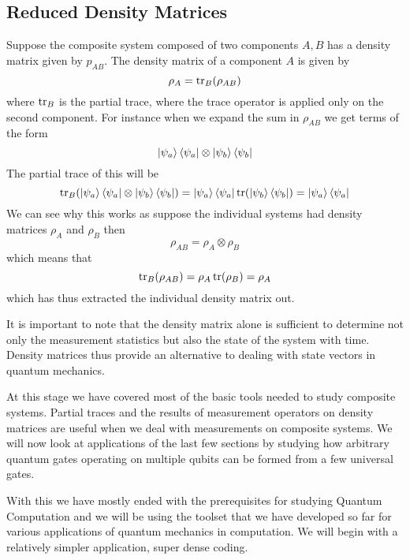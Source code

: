 \subsection{Reduced Density Matrices}
Suppose the composite system composed of two components $A, B$ has a density matrix given by $p_{AB}$. The density matrix of a component $A$ is given by 
$$ \rho_A = \tr_{B}(\rho_{AB})$$ 
where $\tr_{B}$ is the partial trace, where the trace operator is applied only on the second component. For instance when we expand the sum in $\rho_{AB}$ we get terms of the form 
$$\ket{\psi_a}\bra{\psi_a} \otimes \ket{\psi_b}\bra{\psi_b}$$ The partial trace of this will be $$\tr_{B}(\ket{\psi_a}\bra{\psi_a} \otimes \ket{\psi_b}\bra{\psi_b}) = \ket{\psi_a}\bra{\psi_a} \tr(\ket{\psi_b}\bra{\psi_b}) \\ = \ket{\psi_a}\bra{\psi_a} $$
We can see why this works as suppose the individual systems had density matrices $\rho_A$ and $\rho_B$ then $$\rho_{AB} = \rho_A \otimes \rho_B$$ which means that $$\tr_{B}(\rho_{AB}) = \rho_A \tr(\rho_B) = \rho_A$$ which has thus extracted the individual density matrix out.

It is important to note that the density matrix alone is sufficient to determine not only the measurement statistics but also the state of the system with time. Density matrices thus provide an alternative to dealing with state vectors in quantum mechanics.

At this stage we have covered most of the basic tools needed to study composite systems. Partial traces and the results of measurement operators on density matrices are useful when we deal with measurements on composite systems. We will now look at applications of the last few sections by studying how arbitrary quantum gates operating on multiple qubits can be formed from a few universal gates.

With this we have mostly ended with the prerequisites for studying Quantum Computation and we will be using the toolset that we have developed so far for various applications of quantum mechanics in computation. We will begin with a relatively simpler application, super dense coding.
\clearpage